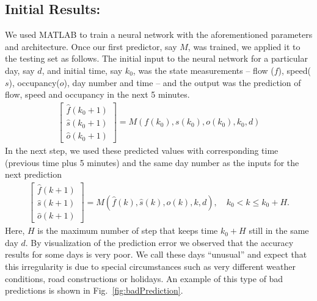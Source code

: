 \documentclass[twocolumn,10pt]{asme2e}
\begin{document}
\subsection{Initial Results:}\label{sec:initial}
We used MATLAB to train a neural network with the aforementioned parameters and architecture. Once our first predictor, say $M$, was trained, we applied it to the testing set as follows. The initial input to the neural network for a particular day, say $d$, and initial time, say $k_0$, was the state measurements -- flow ($f$), speed($s$), occupancy($o$), day number and time -- and the output was the prediction of flow, speed and occupancy in the next 5 minutes. 
\begin{align}
\begin{bmatrix}
\hat{f}(k_0+1)\\\hat{s}(k_0+1)\\\hat{o}(k_0+1)
\end{bmatrix} = M(f(k_0),s(k_0), o(k_0), k_0, d)
\end{align}
In the next step, we used these predicted values with corresponding time (previous time plus 5 minutes) and the same day number as the inputs for the next prediction
\begin{align}
\begin{bmatrix}
\hat{f}(k+1)\\\hat{s}(k+1)\\\hat{o}(k+1)
\end{bmatrix} = M(\hat{f}(k),\hat{s}(k), \hat{o}(k), k, d), \quad k_0<k\le k_0+H.
\end{align}
Here, $H$ is the maximum number of step that keeps time $k_0+H$ still in the same day $d$. By visualization of the prediction error we observed that the accuracy results for some days is very poor. We call these days ``unusual'' and expect that this irregularity is due to special circumstances such as very different weather conditions, road constructions or holidays. An example of this type of bad predictions is shown in Fig.~\ref{fig:badPrediction}.
\end{document}
